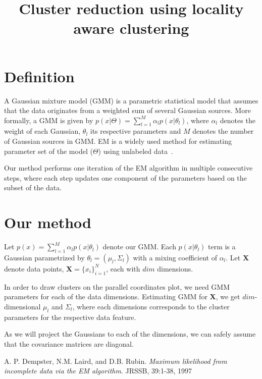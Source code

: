 \documentclass[10pt,a4paper]{article}
\title{Cluster reduction using locality aware clustering}
\begin{document}
\maketitle
\section{Definition}
A Gaussian mixture model (GMM) is a parametric statistical model that assumes that the data originates from a weighted sum of several Gaussian sources. More formally, a GMM is given by
$p(x|\Theta) = \sum^M_{l=1}\alpha_lp(x|\theta_l)$, where $\alpha_l$ denotes the weight of each Gaussian, $\theta_l$ its respective parameters and  $M$ denotes the number of Gaussian sources in GMM. EM is a widely used method for estimating parameter set of the model ($\Theta$) using unlabeled data~\cite{dempster77}.

Our method performs one iteration of the EM algorithm in multiple consecutive steps, where each step updates one component of the parameters based on the subset of the data.

\section{Our method}
Let
$p(x) = \sum_{l=1}^M\alpha_lp(x|\theta_l)$ denote our GMM. Each 
$p(x|\theta_l)$ term is a Gaussian parametrized by $\theta_l = (\mu_l, \Sigma_l)$ with a mixing coefficient of $\alpha_l$. Let {\bf X} denote data points, {\bf X}$ = \{x_i\}_{i=1}^N$, each with $dim$ dimensions.

In order to draw clusters on the parallel coordinates plot, we need GMM parameters for each of the data dimensions. Estimating GMM for {\bf X}, we get $dim$-dimensional $\mu_l$ and $\Sigma_l$, where each dimensions corresponds to the cluster parameters for the respective data feature. 





As we will project the Gaussians to each of the dimensions, we can safely assume that the covariance matrices are diagonal.







\begin{thebibliography}{9}

  A. P. Dempster, N.M. Laird, and D.B. Rubin.
  \emph{Maximum likelihood from incomplete data via the EM algorithm}.
  JRSSB, 39:1-38,
  1997
\end{thebibliography}
\end{document}
